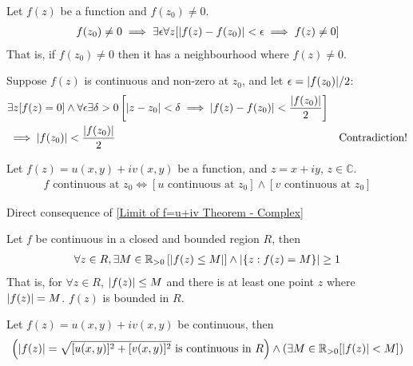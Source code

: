 \documentclass[12pt, english]{book}
\makeatletter
\renewenvironment{proof}[1][\proofname]{\par
	\pushQED{\qed}%
	\normalfont \topsep6\p@\@plus6\p@\relax
	\list{}{%
		\settowidth{\leftmargin}{\itshape\proofname:\hskip\labelsep}%
		\setlength{\labelwidth}{0pt}%
		\setlength{\itemindent}{-\leftmargin}%
	}%
	\item[\hskip\labelsep\itshape#1\@addpunct{:}]\ignorespaces
}{%
	\popQED\endlist\@endpefalse
}
\makeatother
\begin{document}
	\begin{theorem}
		\label{f(z) neq 0 Neighbourhood Theorem - Complex}
		Let $f(z)$ be a function and $f(z_0) \neq 0$.
		\begin{align*}
			f(z_0) \neq 0 
			\implies \exists \epsilon \forall z [\abs{f(z) - f(z_0)}<\epsilon \implies f(z) \neq 0]
		\end{align*}
		That is, if $f(z_0) \neq 0$ then it has a neighbourhood where $f(z) \neq 0$.
	\end{theorem}
	\begin{proof}
		Suppose $f(z)$ is continuous and non-zero at $z_0$, and let $\epsilon = \abs{f(z_0)}/2$:
		\begin{align*}
			&\exists z [f(z) = 0]  \land 
			\forall \epsilon \exists \delta>0 \left[ \abs{z-z_0}<\delta \implies \abs{f(z) - f(z_0)}  < \frac{\abs{f(z_0)}}{2} \right] & \\
			&\implies \abs{f(z_0)} < \frac{\abs{f(z_0)}}{2} & \text{Contradiction!}
		\end{align*}
	\end{proof}

	\begin{theorem}
		Let $f(z) = u(x,y) + iv(x,y)$ be a function, and $z = x + iy$, $z \in \mathbb{C}$. 
		\begin{align*}
			f \text{ continuous at } z_0 \iff \left[ u \text{ continuous at } z_0 \right] \land \left[ v \text{ continuous at } z_0 \right]
		\end{align*}
		\label{Continuity of f=u+iv Theorem - Complex}
	\end{theorem}
	\begin{proof}
		Direct consequence of \cref{Limit of f=u+iv Theorem - Complex}
	\end{proof}
	
	\begin{theorem}
		Let $f$ be continuous in a closed and bounded region $R$, then
		\begin{align*}
			\forall z \in R, \exists M \in \mathbb{R}_{>0}  \left[\abs{f(z) \leq M}\right] 
			\land \abs{\{z : f(z) = M \}} \geq 1
		\end{align*}
		That is, for $\forall z \in R$, $\abs{f(z)} \leq M$ and there is at least one point $z$ where $\abs{f(z)}= M$. $f(z)$ is bounded in $R$.
	\end{theorem}
	\begin{proof}
		Let $f(z) = u(x,y) + iv(x,y)$ be continuous, then 
		\begin{align*}
			\left( \abs{f(z)} = \sqrt{[u(x,y)]^2 + [v(x,y)]^2} \text{ is continuous in } R \right) \land \left( \exists M \in \mathbb{R}_{>0} [\abs{f(z)}<M] \right)
		\end{align*}
	\end{proof}
\end{document}
